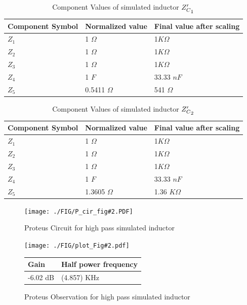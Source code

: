 \documentclass[a4paper,11pt]{article}
\newcommand{\Porcirobs}[4]{
    \begin{figure}[H] %
        \centering
        \texttt{[image: ./FIG/P\_cir\_fig\#2.PDF]}
        \caption{Proteus Circuit for #2}
    \end{figure}


    \begin{figure}[H]  %
        \centering
        \texttt{[image: ./FIG/plot\_Fig\#2.pdf]}
        \begin{tabular}[H]{| m{14em}| m{22em}|}
            \hline
            \rowcolor[rgb]{0.569,0.647,0.947} \textbf{Gain } & \textbf{Half power frequency} \\ \hline
            #3 dB         & (#4) KHz     \\  \hline
        \end{tabular}
        \caption{Proteus Observation for #2}
    \end{figure}
}
\begin{document}
\begin{table}[H]
    \centering
    \begin{tabular}[H]{| m{10em}|m{10em}|m{14em}|}
        \hline
        \rowcolor[rgb]{0.569,0.647,0.947}
        \textbf{Component Symbol}
              & \textbf{Normalized value }
              & \textbf{Final value after scaling}                \\
        \hline
        $Z_1$ & 1 $\Omega$                         & 1$K\Omega$   \\ \hline
        $Z_2$ & 1  $\Omega$                        & 1$K\Omega$   \\ \hline
        $Z_3$ & 1 $\Omega$                         & 1$K\Omega$   \\ \hline
        $Z_4$ & 1 $F$                              & 33.33 $nF$   \\ \hline
        $Z_5$ & 0.5411 $\Omega$                    & 541 $\Omega$ \\ \hline
    \end{tabular}
    \caption{Component Values of simulated inductor  $Z'_{C\textsubscript{$1$}}$}
\end{table}

\begin{table}[H]
    \centering
    \begin{tabular}[H]{| m{10em}|m{10em}|m{14em}|}
        \hline
        \rowcolor[rgb]{0.569,0.647,0.947}
        \textbf{Component Symbol}
              & \textbf{Normalized value }
              & \textbf{Final value after scaling}                  \\
        \hline
        $Z_1$ & 1 $\Omega$                         & 1$K\Omega$     \\ \hline
        $Z_2$ & 1  $\Omega$                        & 1$K\Omega$     \\ \hline
        $Z_3$ & 1 $\Omega$                         & 1$K\Omega$     \\ \hline
        $Z_4$ & 1 $F$                              & 33.33 $nF$     \\ \hline
        $Z_5$ & 1.3605 $\Omega$                    & 1.36 $K\Omega$ \\ \hline
    \end{tabular}
    \caption{Component Values of simulated inductor  $Z'_{C\textsubscript{$2$}}$}
\end{table}

\Porcirobs{0.95}{high pass simulated inductor}{-6.02}{4.857}
\end{document}
